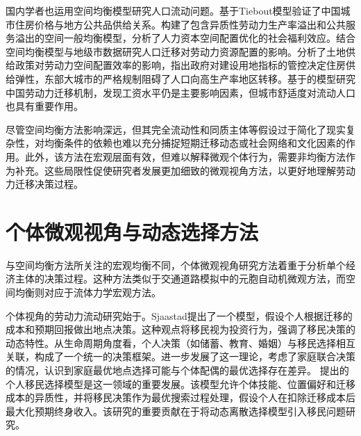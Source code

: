 \documentclass[a4paper, zihao=-4, fontset = mac, oneside]{ctexbook} %
\begin{document}
国内学者也运用空间均衡模型研究人口流动问题。\textcite{LiangRuoBingDiFangGongGongPinGongGeiZhongDeTieboutMoXingJiYuZhongGuoChengShiFangJieDeJingYanYanJiu2008}基于Tiebout模型验证了中国城市住房价格与地方公共品供给关系。\textcite{LiuHuaRenLiZiBenKongJianPeiZhiDeSheHuiFuLiXiaoYingYanJiuJiYuLiangHuaKongJianYiBanJunHengMoXingDeFenXi2024}构建了包含异质性劳动力生产率溢出和公共服务溢出的空间一般均衡模型，分析了人力资本空间配置优化的社会福利效应。\textcite{WangLiLiWoGuoRenKouQianYiChengBenChengShiGuiMoYuShengChanLu2020}结合空间均衡模型与地级市数据研究人口迁移对劳动力资源配置的影响。\textcite{WangLiLiTuDiGongGeiFangJieYuLaoDongLiKongJianPeiZhiXiaoLu2023}分析了土地供给政策对劳动力空间配置效率的影响，指出政府对建设用地指标的管控决定住房供给弹性，东部大城市的严格规制阻碍了人口向高生产率地区转移。\textcite{ZhaoFangZhongGuoChengShiHuaFaZhanJiYuKongJianJunHengMoXingDeYanJiu2017}基于\textcite{diamondDeterminantsWelfareImplications2016}的模型研究中国劳动力迁移机制，发现工资水平仍是主要影响因素，但城市舒适度对流动人口也具有重要作用。

尽管空间均衡方法影响深远，但其完全流动性和同质主体等假设过于简化了现实复杂性，对均衡条件的依赖也难以充分捕捉短期迁移动态或社会网络和文化因素的作用。此外，该方法在宏观层面有效，但难以解释微观个体行为，需要非均衡方法作为补充。这些局限性促使研究者发展更加细致的微观视角方法，以更好地理解劳动力迁移决策过程。


\section{个体微观视角与动态选择方法}

与空间均衡方法所关注的宏观均衡不同，个体微观视角研究方法着重于分析单个经济主体的决策过程。这种方法类似于交通道路模拟中的元胞自动机微观方法，而空间均衡则对应于流体力学宏观方法。

个体视角的劳动力流动研究始于\textcite{sjaastadCostsReturnsHuman1962}。Sjaastad提出了一个模型，假设个人根据迁移的成本和预期回报做出地点决策。这种观点将移民视为投资行为，强调了移民决策的动态特性。从生命周期角度看，个人决策（如储蓄、教育、婚姻）与移民选择相互关联，构成了一个统一的决策框架。\textcite{mincerFamilyMigrationDecisions1978}进一步发展了这一理论，考虑了家庭联合决策的情况，认识到家庭最优地点选择可能与个体配偶的最优选择存在差异。
\textcite{kennanEffectExpectedIncome2011}提出的个人移民选择模型是这一领域的重要发展。该模型允许个体技能、位置偏好和迁移成本的异质性，并将移民决策作为最优搜索过程处理，假设个人在扣除迁移成本后最大化预期终身收入。该研究的重要贡献在于将动态离散选择模型引入移民问题研究。
\end{document}

